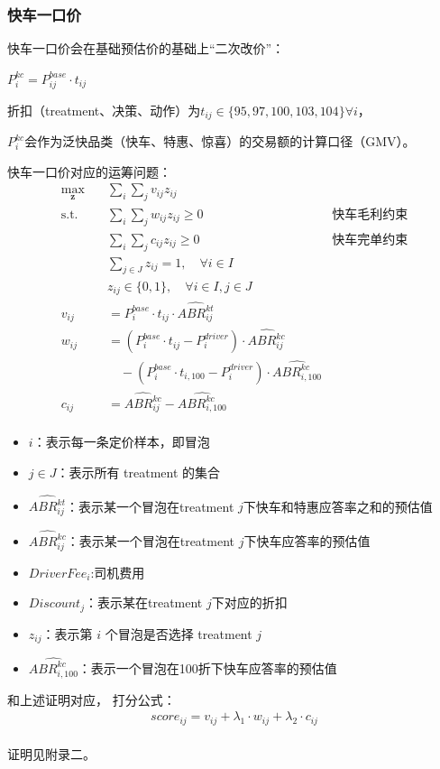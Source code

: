 \documentclass[12pt, a4paper]{article}
\begin{document}
\subsubsection{快车一口价}
快车一口价会在基础预估价的基础上“二次改价”：\par
$P^{kc}_i=P^{base}_{ij}\cdot t_{ij}$\par
折扣（treatment、决策、动作）为$t_{ij}\in\{95,97,100,103,104\} \forall i$，
\par$P^{kc}_i$会作为泛快品类（快车、特惠、惊喜）的交易额的计算口径（GMV）。\par
快车一口价对应的运筹问题：
\begin{equation} 
\begin{aligned}
\max_{\bm{z}}\quad & \sum_{i }\sum_{j} v_{ij} z_{ij} \\
\text{s.t.} \quad & \sum_{i }\sum_{j } w_{ij} z_{ij} \geq 0 &  \text{快车毛利约束}\\
& \sum_{i}\sum_{j} c_{ij} z_{ij} \geq 0 &\text{快车完单约束} \\
& \sum_{j \in J} z_{ij} = 1, \quad \forall i \in I  \\
& z_{ij} \in \{0,1\}, \quad \forall i \in I, j \in J \\
v_{ij} &= P^{base}_i \cdot t_{ij} \cdot \widehat{ABR^{kt}_{ij}} \\
w_{ij} &= (P^{base}_i \cdot t_{ij} - P^{driver}_i) \cdot \widehat{ABR^{kc}_{ij}} \\
&\quad - (P^{base}_i \cdot t_{i,100} - P^{driver}_i) \cdot \widehat{ABR^{kc}_{i,100}} \\
c_{ij} &=  \widehat{ABR^{kc}_{ij}}-\widehat{ABR^{kc}_{i,100}} \\
\end{aligned}
\end{equation} 
\begin{itemize}
    
    \item $i$：表示每一条定价样本，即冒泡
    \item $j \in J$：表示所有 treatment 的集合
    \item $\widehat{ABR^{kt}_{ij}}$：表示某一个冒泡在treatment $j$下快车和特惠应答率之和的预估值
    \item $\widehat{ABR^{kc}_{ij}}$：表示某一个冒泡在treatment $j$下快车应答率的预估值
    \item $DriverFee_i$:司机费用
    \item $Discount_{j}$：表示某在treatment $j$下对应的折扣
    \item $z_{ij}$：表示第 $i$ 个冒泡是否选择 treatment $j$
    \item $\widehat{ABR^{kc}_{i,100}}$：表示一个冒泡在100折下快车应答率的预估值
\end{itemize}
和上述证明对应，
打分公式：$$\begin{aligned}
score_{ij} = v_{ij}+\lambda_1\cdot w_{ij}+\lambda_2\cdot  c_{ij}
\end{aligned}
$$\\
证明见附录二。
\end{document}
